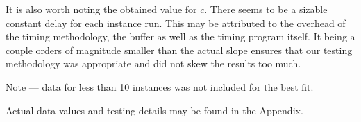 \begin{arabicparts}
    It is also worth noting the obtained value for $c$. There seems to be a sizable
    constant delay for each instance run. This may be attributed to the overhead
    of the timing methodology, the buffer as well as the timing program itself.
    It being a couple orders of magnitude smaller than the actual slope ensures
    that our testing methodology was appropriate and did not skew the results 
    too much. 

    {\small Note --- data for less than 10 instances was not included for the best fit.}

    {\small Actual data values and testing details may be found in the Appendix.}

\end{arabicparts}
